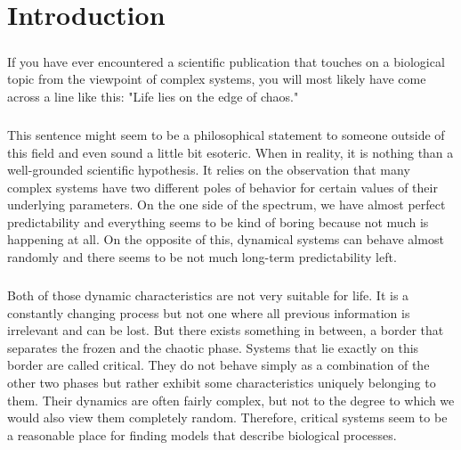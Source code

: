 \chapter{Introduction}\thispagestyle{fancy}
\paragraph*{}
If you have ever encountered a scientific publication that touches on a biological topic from the viewpoint of complex systems, you will most likely have come across a line like this: "Life lies on the edge of chaos."

\paragraph*{}
This sentence might seem to be a philosophical statement to someone outside of this field and even sound a little bit esoteric. When in reality, it is nothing than a well-grounded scientific hypothesis. It relies on the observation that many complex systems have two different poles of behavior for certain values of their underlying parameters. On the one side of the spectrum, we have almost perfect predictability and everything seems to be kind of boring because not much is happening at all. On the opposite of this, dynamical systems can behave almost randomly and there seems to be not much long-term predictability left.


\paragraph*{}
Both of those dynamic characteristics are not very suitable for life. It is a constantly changing process but not one where all previous information is irrelevant and can be lost. But there exists something in between, a border that separates the frozen and the chaotic phase. Systems that lie exactly on this border are called critical. They do not behave simply as a combination of the other two phases but rather exhibit some characteristics uniquely belonging to them. Their dynamics are often fairly complex, but not to the degree to which we would also view them completely random. Therefore, critical systems seem to be a reasonable place for finding models that describe biological processes.

